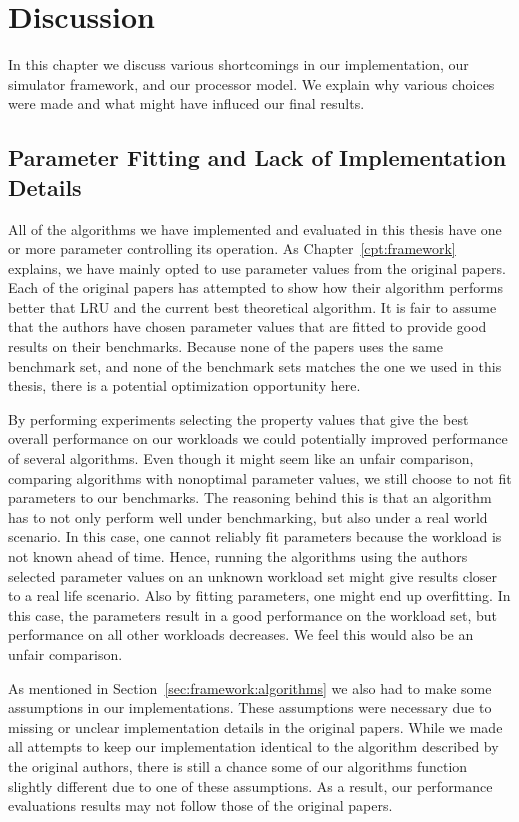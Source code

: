 
\chapter{Discussion}
\label{cpt:discussion}

In this chapter we discuss various shortcomings in our implementation, our simulator framework, and our processor model.
We explain why various choices were made and what might have influced our final results.

\section{Parameter Fitting and Lack of Implementation Details}

All of the algorithms we have implemented and evaluated in this thesis have one or more parameter controlling its operation.
As Chapter~\ref{cpt:framework} explains, we have mainly opted to use parameter values from the original papers.
Each of the original papers has attempted to show how their algorithm performs better that LRU and the current best theoretical algorithm.
It is fair to assume that the authors have chosen parameter values that are fitted to provide good results on their benchmarks.
Because none of the papers uses the same benchmark set, and none of the benchmark sets matches the one we used in this thesis, there is a potential optimization opportunity here.

By performing experiments selecting the property values that give the best overall performance on our workloads we could potentially improved performance of several algorithms.
Even though it might seem like an unfair comparison, comparing algorithms with nonoptimal parameter values, we still choose to not fit parameters to our benchmarks.
The reasoning behind this is that an algorithm has to not only perform well under benchmarking, but also under a real world scenario.
In this case, one cannot reliably fit parameters because the workload is not known ahead of time.
Hence, running the algorithms using the authors selected parameter values on an unknown workload set might give results closer to a real life scenario.
Also by fitting parameters, one might end up overfitting.
In this case, the parameters result in a good performance on the workload set, but performance on all other workloads decreases.
We feel this would also be an unfair comparison.

As mentioned in Section~\ref{sec:framework:algorithms} we also had to make some assumptions in our implementations.
These assumptions were necessary due to missing or unclear implementation details in the original papers.
While we made all attempts to keep our implementation identical to the algorithm described by the original authors, there is still a chance some of our algorithms function slightly different due to one of these assumptions.
As a result, our performance evaluations results may not follow those of the original papers.




